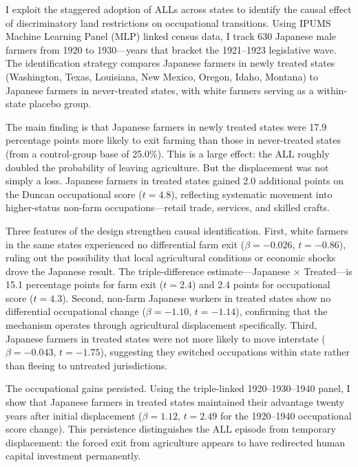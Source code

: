 \documentclass[12pt]{article}
\begin{document}
I exploit the staggered adoption of ALLs across states to identify the causal effect of discriminatory land restrictions on occupational transitions. Using IPUMS Machine Learning Panel (MLP) linked census data, I track 630 Japanese male farmers from 1920 to 1930---years that bracket the 1921--1923 legislative wave. The identification strategy compares Japanese farmers in newly treated states (Washington, Texas, Louisiana, New Mexico, Oregon, Idaho, Montana) to Japanese farmers in never-treated states, with white farmers serving as a within-state placebo group.

The main finding is that Japanese farmers in newly treated states were 17.9 percentage points more likely to exit farming than those in never-treated states (from a control-group base of 25.0\%). This is a large effect: the ALL roughly doubled the probability of leaving agriculture. But the displacement was not simply a loss. Japanese farmers in treated states gained 2.0 additional points on the Duncan occupational score ($t = 4.8$), reflecting systematic movement into higher-status non-farm occupations---retail trade, services, and skilled crafts.

Three features of the design strengthen causal identification. First, white farmers in the same states experienced no differential farm exit ($\beta = -0.026$, $t = -0.86$), ruling out the possibility that local agricultural conditions or economic shocks drove the Japanese result. The triple-difference estimate---Japanese $\times$ Treated---is 15.1 percentage points for farm exit ($t = 2.4$) and 2.4 points for occupational score ($t = 4.3$). Second, non-farm Japanese workers in treated states show no differential occupational change ($\beta = -1.10$, $t = -1.14$), confirming that the mechanism operates through agricultural displacement specifically. Third, Japanese farmers in treated states were not more likely to move interstate ($\beta = -0.043$, $t = -1.75$), suggesting they switched occupations within state rather than fleeing to untreated jurisdictions.

The occupational gains persisted. Using the triple-linked 1920--1930--1940 panel, I show that Japanese farmers in treated states maintained their advantage twenty years after initial displacement ($\beta = 1.12$, $t = 2.49$ for the 1920--1940 occupational score change). This persistence distinguishes the ALL episode from temporary displacement: the forced exit from agriculture appears to have redirected human capital investment permanently.
\end{document}
